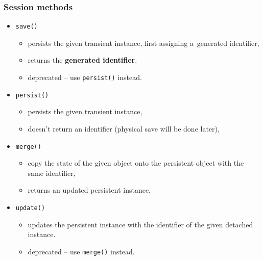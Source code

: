 \documentclass[10pt,xcolor=pdflatex]{beamer}
\begin{document}
\begin{frame}[fragile]\frametitle{Session methods}
  \begin{itemize}
    \item \texttt{save()}
      \begin{itemize}
        \item persists the given transient instance, first assigning a~generated identifier,
        \item returns the \textbf{generated identifier}.
        \item deprecated -- use \texttt{persist()} instead.
      \end{itemize}
    \item \texttt{persist()}
      \begin{itemize}
        \item persists the given transient instance,
        \item doesn't return an identifier (physical save will be done later),
      \end{itemize}
    \item \texttt{merge()}
      \begin{itemize}
        \item copy the state of the given object onto the persistent object with the same identifier,
        \item returns an updated persistent instance.
      \end{itemize}
    \item \texttt{update()}
      \begin{itemize}
        \item updates the persistent instance with the identifier of the given detached instance.
        \item deprecated -- use \texttt{merge()} instead.
      \end{itemize}
  \end{itemize}
\end{frame}
\end{document}
